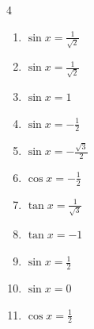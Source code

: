 \begin{multicols}{4}
\begin{enumerate}
  \item $\displaystyle \sin{x}  = \frac{1}{\sqrt{2}}$


  \item $\displaystyle \sin{x}  = \frac{1}{\sqrt{2}}$


  \item $\displaystyle \sin{x}  = 1$


  \item $\displaystyle \sin{x}  = -\frac{1}{2}$


  \item $\displaystyle \sin{x}  = -\frac{\sqrt{3}}{2}$


  \item $\displaystyle \cos{x}  = -\frac{1}{2}$


\columnbreak %

\resetques

  \item $\displaystyle \tan{x}  = \frac{1}{\sqrt{3}}$


  \item $\displaystyle \tan{x}  = -1$


  \item $\displaystyle \sin{x}  = \frac{1}{2}$


  \item $\displaystyle \sin{x}  = 0$

        \phantom{$\displaystyle x = 0 , \pi$}

  \item $\displaystyle \cos{x}  = \frac{1}{2}$



\end{enumerate}
\end{multicols}
